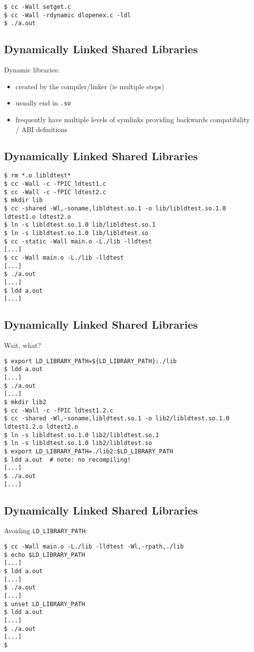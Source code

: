 \documentclass[xga]{xdvislides}
\begin{document}
\begin{verbatim}
$ cc -Wall setget.c
$ cc -Wall -rdynamic dlopenex.c -ldl
$ ./a.out
\end{verbatim}

\subsection{Dynamically Linked Shared Libraries}
Dynamic libraries:
\begin{itemize}
	\item created by the compiler/linker (ie multiple steps)
	\item usually end in {\tt .so}
	\item frequently have multiple levels of symlinks providing
		backwards compatibility / ABI definitions
\end{itemize}

\subsection{Dynamically Linked Shared Libraries}
\begin{verbatim}
$ rm *.o libldtest*
$ cc -Wall -c -fPIC ldtest1.c
$ cc -Wall -c -fPIC ldtest2.c
$ mkdir lib
$ cc -shared -Wl,-soname,libldtest.so.1 -o lib/libldtest.so.1.0 ldtest1.o ldtest2.o
$ ln -s libldtest.so.1.0 lib/libldtest.so.1
$ ln -s libldtest.so.1.0 lib/libldtest.so
$ cc -static -Wall main.o -L./lib -lldtest
[...]
$ cc -Wall main.o -L./lib -lldtest
[...]
$ ./a.out
[...]
$ ldd a.out
[...]
\end{verbatim}

\subsection{Dynamically Linked Shared Libraries}
Wait, what?
\begin{verbatim}
$ export LD_LIBRARY_PATH=${LD_LIBRARY_PATH}:./lib
$ ldd a.out
[...]
$ ./a.out
[...]
$ mkdir lib2
$ cc -Wall -c -fPIC ldtest1.2.c
$ cc -shared -Wl,-soname,libldtest.so.1 -o lib2/libldtest.so.1.0 ldtest1.2.o ldtest2.o
$ ln -s libldtest.so.1.0 lib2/libldtest.so.1
$ ln -s libldtest.so.1.0 lib2/libldtest.so
$ export LD_LIBRARY_PATH=./lib2:$LD_LIBRARY_PATH
$ ldd a.out  # note: no recompiling!
[...]
$ ./a.out
[...]
\end{verbatim}

\subsection{Dynamically Linked Shared Libraries}
Avoiding {\tt LD\_LIBRARY\_PATH}:
\begin{verbatim}
$ cc -Wall main.o -L./lib -lldtest -Wl,-rpath,./lib
$ echo $LD_LIBRARY_PATH
[...]
$ ldd a.out
[...]
$ ./a.out
[...]
$ unset LD_LIBRARY_PATH
$ ldd a.out
[...]
$ ./a.out
[...]
$
\end{verbatim}
\end{document}
